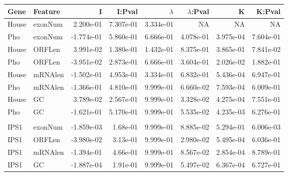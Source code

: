 \documentclass[varwidth,convert]{standalone}
\begin{document}
\begin{tabular}{llrrrrrr}
\toprule
Gene & Feature & I & I:Pval & $\lambda$ & $\lambda$:Pval & K & K:Pval \\ 
\midrule
House & exonNum & 2.200e-01 & 7.307e-01 & 3.334e-01 &        NA &        NA &        NA \\ 
Pho & exonNum & -1.774e-01 &  5.860e-01 &  6.666e-01 &  4.078e-01 &  3.975e-04 &  7.604e-01 \\ 
House & ORFLen & 3.991e-02 & 1.380e-01 & 1.432e-01 & 8.375e-01 & 3.865e-01 & 7.841e-02 \\ 
Pho & ORFLen & -3.951e-02 &  2.873e-01 &  6.666e-01 &  3.604e-01 &  2.026e-02 &  1.882e-01 \\ 
House & mRNAlen & -1.502e-01 &  4.953e-01 &  3.334e-01 &  6.832e-01 &  5.436e-04 &  6.947e-01 \\ 
Pho & mRNAlen & -1.366e-01 &  4.810e-01 &  9.999e-01 &  6.660e-02 &  7.593e-04 &  6.009e-01 \\ 
House & GC & 3.789e-02 & 2.567e-01 & 9.999e-01 & 3.328e-02 & 4.275e-04 & 7.551e-01 \\ 
Pho & GC & -1.621e-01 &  5.170e-01 &  9.999e-01 &  5.535e-02 &  4.235e-03 &  6.276e-01 \\ 
\\
IPS1 & exonNum & -1.859e-03 & 1.68e-01 & 9.999e-01 & 8.885e-02 & 5.294e-01 & 6.006e-03 \\ 
IPS1 & ORFLen & -3.980e-02 & 3.13e-01 & 9.999e-01 & 2.980e-02 & 5.495e-04 & 6.036e-01 \\ 
IPS1 & mRNAlen & -1.394e-01 & 4.66e-01 & 9.999e-01 & 8.567e-02 & 2.854e-04 & 8.789e-01 \\ 
IPS1 & GC & -1.887e-04 & 1.91e-01 & 9.999e-01 & 5.497e-02 & 6.367e-04 & 6.727e-01 \\ 
\bottomrule

\end{tabular}
\end{document}
